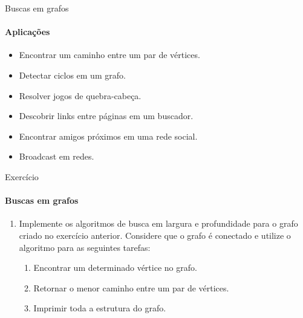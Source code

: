 \begin{frame}{Buscas em grafos}
	\framesubtitle{Aplicações}
	
	\begin{itemize}
		\item Encontrar um caminho entre um par de vértices.
		\item Detectar ciclos em um grafo.
		\item Resolver jogos de quebra-cabeça.
		\item Descobrir links entre páginas em um buscador.
		\item Encontrar amigos próximos em uma rede social.
		\item Broadcast em redes.
	\end{itemize}
\end{frame}



\begin{frame}{Exercício}
	\framesubtitle{Buscas em grafos}
	
	\begin{enumerate}
		\item Implemente os algoritmos de busca em largura e profundidade para o grafo criado no exercício anterior. Considere que o grafo é conectado e utilize o algoritmo para as seguintes tarefas:
		\begin{enumerate}
			\item Encontrar um determinado vértice no grafo.
			\item Retornar o menor caminho entre um par de vértices.
			\item Imprimir toda a estrutura do grafo.
		\end{enumerate}
	\end{enumerate}
\end{frame}



